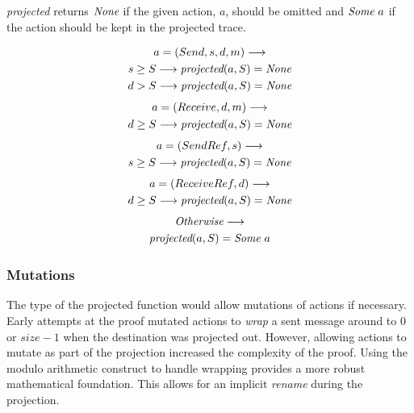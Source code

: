 \documentclass[runningheads]{llncs}
\begin{document}
\emph{projected} returns $\emph{None}$ if the given action, $a$,  should be omitted and $\emph{Some}\ a$ if the action should be kept in the projected trace.

\begin{definition}[projected]
\begin{multline*}
a = (Send, s, d, m) \longrightarrow \\
s \ge S \longrightarrow \emph{projected}(a, S) = \emph{None} \\
d > S \longrightarrow \emph{projected}(a, S) = \emph{None} \\
\end{multline*}
\begin{multline*}
a = (Receive, d, m) \longrightarrow \\
d \ge S \longrightarrow \emph{projected}(a, S) = \emph{None} \\
\end{multline*}
\begin{multline*}
a = (SendRef, s) \longrightarrow \\
s \ge S \longrightarrow \emph{projected}(a, S) = \emph{None} \\
\end{multline*}
\begin{multline*}
a = (ReceiveRef, d) \longrightarrow \\
d \ge S \longrightarrow \emph{projected}(a, S) = \emph{None} \\
\end{multline*}
\begin{multline*}
\emph{Otherwise} \longrightarrow \\
\emph{projected}(a, S) = \emph{Some}\ a\\
\end{multline*}
\end{definition}


\subsubsection{Mutations}
The type of the projected function would allow mutations of actions if necessary. Early attempts at the proof mutated actions to \emph{wrap} a sent message around to $0$ or $size-1$ when the destination was projected out. However, allowing actions to mutate as part of the projection increased the complexity of the proof. Using the modulo arithmetic construct to handle wrapping provides a more robust mathematical foundation. This allows for an implicit \emph{rename} during the projection. 
\end{document}
